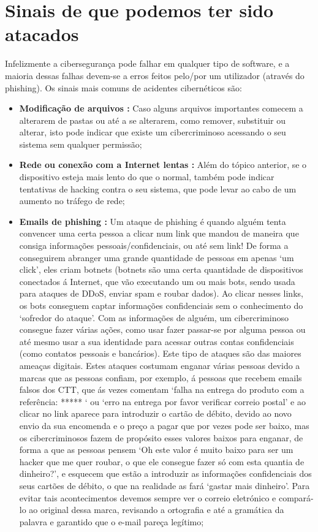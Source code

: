 \documentclass{report}
\begin{document}
\section{Sinais de que podemos ter sido atacados}

\normalsize{Infelizmente a cibersegurança pode falhar em qualquer tipo de software, e a maioria dessas falhas devem-se a erros feitos pelo/por um utilizador (através do phishing). Os sinais mais comuns de acidentes cibernéticos são: 
\begin{itemize}
    \item   \textbf{Modificação de arquivos : } Caso alguns arquivos importantes comecem a alterarem de pastas ou até a se alterarem, como remover, substituir ou alterar, isto pode indicar que existe um cibercriminoso acessando o seu sistema sem qualquer permissão;
    
    \item   \textbf{Rede ou conexão com a Internet lentas : } Além do tópico anterior, se o dispositivo esteja mais lento do que o normal, também pode indicar tentativas de hacking contra o seu sistema, que pode levar ao cabo de um aumento no tráfego de rede;
    
    \item   \textbf{Emails de phishing : } Um ataque de phishing é quando alguém tenta convencer uma certa pessoa a clicar num link que mandou de maneira que consiga informações pessoais/confidenciais, ou até sem link! De forma a conseguirem abranger uma grande quantidade de pessoas em apenas ‘um click’, eles criam botnets (botnets são uma certa quantidade de dispositivos conectados á Internet, que vão executando um ou mais bots, sendo usada para ataques de \ac{DDoS}, enviar spam e roubar dados). Ao clicar nesses links, os bots conseguem captar informações confidenciais sem o conhecimento do ‘sofredor do ataque’. Com as informações de alguém, um cibercriminoso consegue fazer várias ações, como usar fazer passar-se por alguma pessoa ou até mesmo usar a sua identidade para acessar outras contas confidenciais (como contatos pessoais e bancários). Este tipo de ataques são das maiores ameaças digitais. Estes ataques costumam enganar várias pessoas devido a marcas que as pessoas confiam, por exemplo, á pessoas que recebem emails falsos dos \ac{CTT}, que ás vezes comentam ‘falha na entrega do produto com a referência: ***** ‘ ou ‘erro na entrega por favor verificar correio postal’ e ao clicar no link aparece para introduzir o cartão de débito, devido ao novo envio da sua encomenda e o preço a pagar que por vezes pode ser baixo, mas os cibercriminosos fazem de propósito esses valores baixos para enganar, de forma a que as pessoas pensem ‘Oh este valor é muito baixo para ser um hacker que me quer roubar, o que ele consegue fazer só com esta quantia de dinheiro?’, e esquecem que estão a introduzir as informações confidenciais dos seus cartões de débito, o que na realidade as fará ‘gastar mais dinheiro’. Para evitar tais acontecimentos devemos sempre ver o correio eletrónico e compará-lo ao original dessa marca, revisando a ortografia e até a gramática da palavra e garantido que o e-mail pareça legítimo;
    

\end{itemize}}
\end{document}
